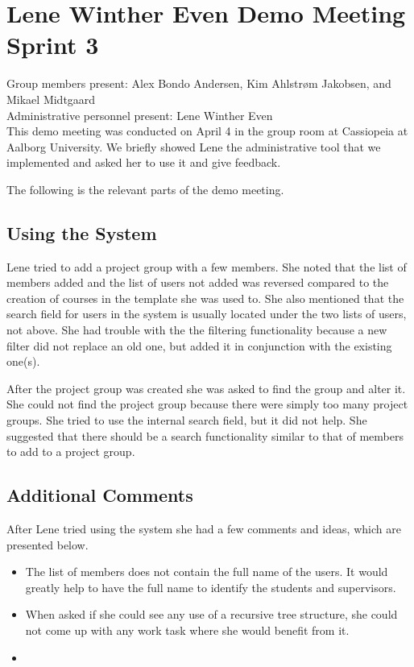 \section{Lene Winther Even Demo Meeting Sprint 3}
\label{sec:lenedemoone}
Group members present: Alex Bondo Andersen, Kim Ahlstr\o{}m Jakobsen, and Mikael Midtgaard\\
Administrative personnel present: Lene Winther Even\\

This demo meeting was conducted on April 4\ths{} in the group room at Cassiopeia at Aalborg University.
We briefly showed Lene the administrative tool that we implemented and asked her to use it and give feedback.

The following is the relevant parts of the demo meeting.

\subsection*{Using the System}
Lene tried to add a project group with a few members.
She noted that the list of members added and the list of users not added was reversed compared to the creation of courses in the \moodle{} template she was used to.
She also mentioned that the search field for users in the system is usually located under the two lists of users, not above.
She had trouble with the the filtering functionality because a new filter did not replace an old one, but added it in conjunction with the existing one(s).

After the project group was created she was asked to find the group and alter it.
She could not find the project group because there were simply too many project groups.
She tried to use the internal search field, but it did not help.
She suggested that there should be a search functionality similar to that of members to add to a project group.

\subsection*{Additional Comments}
After Lene tried using the system she had a few comments and ideas, which are presented below.
\begin{itemize}
	\item The list of members does not contain the full name of the users.
	It would greatly help to have the full name to identify the students and supervisors.
	\item When asked if she could see any use of a recursive tree structure, she could not come up with any work task where she would benefit from it.
	\item 
\end{itemize}
